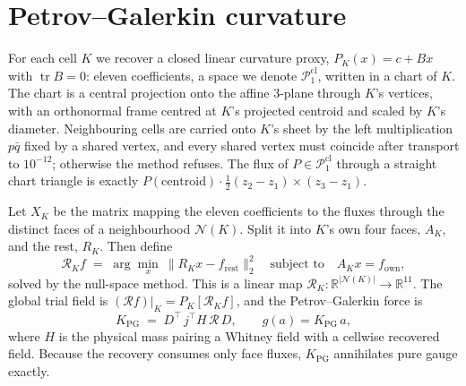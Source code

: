 \documentclass[11pt]{article}
\theoremstyle{definition}
\theoremstyle{remark}
\newcommand{\RR}{\mathbb{R}}
\newcommand{\cR}{\mathcal{R}}
\newcommand{\norm}[1]{\lVert #1\rVert}
\newcommand{\Pone}{\mathcal{P}_1^{\mathrm{cl}}}
\begin{document}
\section{Petrov--Galerkin curvature}\label{sec:pg}

For each cell $K$ we recover a closed linear curvature proxy, $P_K(x)=c+Bx$ with
$\operatorname{tr}B=0$: eleven coefficients, a space we denote $\Pone$, written in a chart
of $K$. The chart is a central projection onto the affine $3$-plane through $K$'s
vertices, with an orthonormal frame centred at $K$'s projected centroid and scaled by
$K$'s diameter. Neighbouring cells are carried onto $K$'s sheet by the left
multiplication $p\bar q$ fixed by a shared vertex, and every shared vertex must coincide
after transport to $10^{-12}$; otherwise the method refuses. The flux of $P\in\Pone$
through a straight chart triangle is exactly $P(\text{centroid})\cdot\tfrac12(z_2-z_1)\times(z_3-z_1)$.

Let $X_K$ be the matrix mapping the eleven coefficients to the fluxes through the
distinct faces of a neighbourhood $\mathcal{N}(K)$. Split it into $K$'s own four faces,
$A_K$, and the rest, $R_K$. Then define
\begin{equation}\label{eq:fit}
  \cR_K f \;=\; \arg\min_{x}\ \norm{R_Kx-f_{\mathrm{rest}}}_2^2
  \quad\text{subject to}\quad A_Kx=f_{\mathrm{own}},
\end{equation}
solved by the null-space method. This is a linear map $\cR_K:\RR^{|\mathcal{N}(K)|}\to\RR^{11}$.
The global trial field is $(\cR f)|_K=P_K[\cR_Kf]$, and the Petrov--Galerkin force is
\begin{equation}
  K_{\mathrm{PG}} \;=\; D^\top\, j^\top H\,\cR\,D,\qquad g(a)=K_{\mathrm{PG}}\,a,
\end{equation}
where $H$ is the physical mass pairing a Whitney field with a cellwise recovered field.
Because the recovery consumes only face fluxes, $K_{\mathrm{PG}}$ annihilates pure gauge
exactly.
\end{document}
